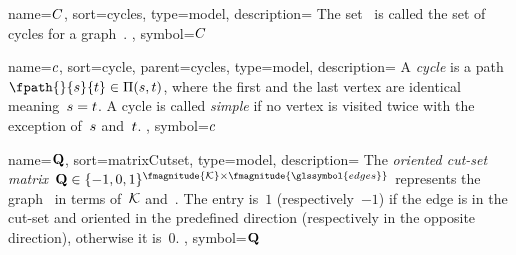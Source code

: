 {
    name={\ensuremath{ \cycles }},
    sort={cycles},
    type={model},
    description={
        The set~ is called the set of cycles for a
        graph~.
    },
    symbol={\ensuremath{ \cycles }}
}

{
    name={\ensuremath{ \cycle }},
    sort={cycle},
    parent={cycles},
    type={model},
    description={
        A \emph{cycle} is a
        path~$\fpath{}{\source}{\sink}\in\paths(\source,\sink)$, where the first and the
        last vertex are identical meaning~$s = t$. A cycle is called
        \emph{simple} if no vertex is visited twice with the exception of~$s$
        and~$t$.
    },
    symbol={\ensuremath{ \cycle }}
}

{
    name={\ensuremath{ \cutsetMatrix }},
    sort={matrixCutset},
    type={model},
    description={
        The \emph{oriented cut-set matrix}~$\cutsetMatrix\in\{-1, 0, 1\}^{
        \fmagnitude{\cutsets}\times\fmagnitude{\glssymbol{edges}}}$
        represents the graph~ in terms of~$\mathcal{K}$
        and~. The entry is~$1$ (respectively~$-1$) if the edge
        is in the cut-set and oriented in the predefined direction (respectively
        in the opposite direction), otherwise it is~$0$.
    },
    symbol={\ensuremath{ \cutsetMatrix }}
}